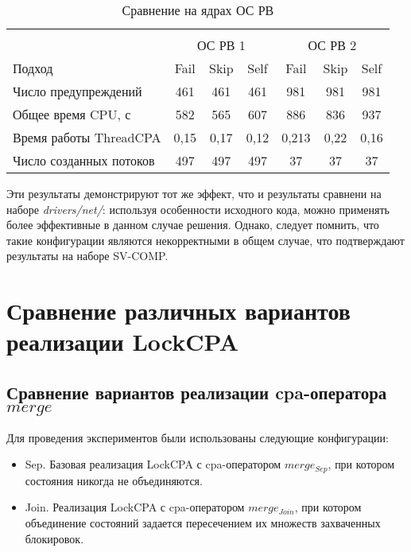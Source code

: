   \begin{table}[h]\footnotesize \centering
    \caption{Сравнение на ядрах ОС РВ}
  	\label{table-os-thread-create}
    \begin{tabular}{ | l | c | c | c | c | c | c |}
      \hline
      				& 		\multicolumn{3}{c|}{\combatmode} 		& \multicolumn{3}{c|}{\combatmode} \\
      						& 		\multicolumn{3}{c|}{ОС РВ 1} 		& \multicolumn{3}{c|}{ОС РВ 2} \\
      Подход         				& Fail 		& Skip 		& Self 		& Fail 		& Skip 		& Self  \\ \hline
      Число предупреждений			& 461   	& 461  		& 461  		& 981   	& 981   	& 981   \\ 
  	  Общее время CPU, с 			& 582 		& 565 		& 607  		& 886   	& 836	  	& 937   \\ 
\hspace{0.5cm} Время работы ThreadCPA & 0,15	& 0,17 		& 0,12 		& 0,213   	& 0,22 		& 0,16   \\ \hline
      Число созданных потоков  		& 497    	& 497    	& 497   	& 37   		& 37  		& 37   \\ 
      \hline
    \end{tabular}
  \end{table}

Эти результаты демонстрируют тот же эффект, что и результаты  сравнени на наборе \textit{drivers/net/}: используя особенности исходного кода, можно применять более эффективные в данном случае решения.
Однако, следует помнить, что такие конфигурации являются некорректными в общем случае, что подтверждают результаты на наборе SV-COMP.


\section{Сравнение различных вариантов реализации LockCPA}

\subsection{Сравнение вариантов реализации cpa-оператора $merge$}

Для проведения экспериментов были использованы следующие конфигурации:

\begin{itemize}
\item Sep. Базовая реализация LockCPA с cpa-оператором $merge_{Sep}$, при котором состояния никогда не объединяются.
\item Join. Реализация LockCPA с cpa-оператором $merge_{Join}$, при котором объединение состояний задается пересечением их множеств захваченных блокировок.
\end{itemize}

